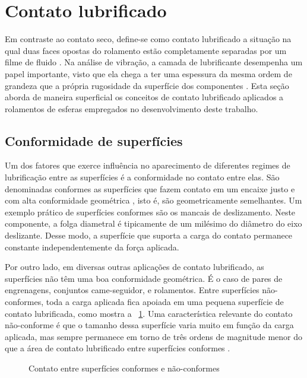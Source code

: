 \documentclass[12pt,oneside,english,brazil,lmodern,siglas,simbolos,cite=num]{ucsmonograph}
\begin{document}
	\section{Contato lubrificado}
	Em contraste ao contato seco, define-se como contato lubrificado a situação na qual duas faces opostas do rolamento estão completamente separadas por um filme de fluido \cite{hamrock:1991}.
	Na análise de vibração, a camada de lubrificante desempenha um papel importante, visto que ela chega a ter uma espessura da mesma ordem de grandeza que a própria rugosidade da superfície dos componentes \cite{sassi:2007}.
	Esta seção aborda de maneira superficial os conceitos de contato lubrificado aplicados a rolamentos de esferas empregados no desenvolvimento deste trabalho.
	
	\subsection{Conformidade de superfícies}
	Um dos fatores que exerce influência no aparecimento de diferentes regimes de lubrificação entre as superfícies é a conformidade no contato entre elas.
	São denominadas conformes as superfícies que fazem contato em um encaixe justo e com alta conformidade geométrica \cite{hamrock:1991}, isto é, são geometricamente semelhantes.
	Um exemplo prático de superfícies conformes são os mancais de deslizamento.
	Neste componente, a folga diametral é tipicamente de um milésimo do diâmetro do eixo deslizante.
	Desse modo, a superfície que suporta a carga do contato permanece constante independentemente da força aplicada.
	
	Por outro lado, em diversas outras aplicações de contato lubrificado, as superfícies não têm uma boa conformidade geométrica.
	É o caso de pares de engrenagens, conjuntos came-seguidor, e rolamentos.
	Entre superfícies não-conformes, toda a carga aplicada fica apoiada em uma pequena superfície de contato lubrificada, como mostra a \figurename\ \ref{fig:contato-conforme}.
	Uma característica relevante do contato não-conforme é que o tamanho dessa superfície varia muito em função da carga aplicada, mas sempre permanece em torno de três ordens de magnitude menor do que a área de contato lubrificado entre superfícies conformes \cite{hamrock:1991}.
	
	\begin{figure}[ht]
		\caption{Contato entre superfícies conformes e não-conformes}
		\label{fig:contato-conforme}
	\end{figure}
	
\end{document}
